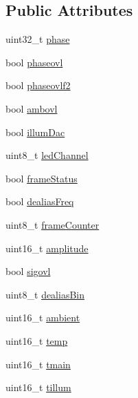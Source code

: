 \subsection*{Public Attributes}
\begin{DoxyCompactItemize}
\item 
uint32\+\_\+t \mbox{\hyperlink{class_o_p_t3101frame_data_a4d07c723715856ea9652b3d672d01191}{phase}}
\item 
bool \mbox{\hyperlink{class_o_p_t3101frame_data_ab71ed5cd3a72ab4c4d46159aee96f9b9}{phaseovl}}
\item 
bool \mbox{\hyperlink{class_o_p_t3101frame_data_aaf6bdf023298dc74ba130812f7d2166e}{phaseovlf2}}
\item 
bool \mbox{\hyperlink{class_o_p_t3101frame_data_ab84944f362b3b192623351ad0f65ce20}{ambovl}}
\item 
bool \mbox{\hyperlink{class_o_p_t3101frame_data_a8b74b6e231e0b4b2cd1e88904bac642c}{illum\+Dac}}
\item 
uint8\+\_\+t \mbox{\hyperlink{class_o_p_t3101frame_data_a9319425349dd5d97faa2e525f41f391b}{led\+Channel}}
\item 
bool \mbox{\hyperlink{class_o_p_t3101frame_data_a790964613d473578a86a653a6a73b640}{frame\+Status}}
\item 
bool \mbox{\hyperlink{class_o_p_t3101frame_data_ac57c7900e7d17af6b38f581af290f9f1}{dealias\+Freq}}
\item 
uint8\+\_\+t \mbox{\hyperlink{class_o_p_t3101frame_data_ac3c83f1d1ac041f9c7d76b9f17ba4288}{frame\+Counter}}
\item 
uint16\+\_\+t \mbox{\hyperlink{class_o_p_t3101frame_data_afa54605b8cda791f6db34b225aa6574e}{amplitude}}
\item 
bool \mbox{\hyperlink{class_o_p_t3101frame_data_a85c53a23858d7716ceee6cb01eb29f1a}{sigovl}}
\item 
uint8\+\_\+t \mbox{\hyperlink{class_o_p_t3101frame_data_af137abf981abb2d3a81c82dd1ce883bf}{dealias\+Bin}}
\item 
uint16\+\_\+t \mbox{\hyperlink{class_o_p_t3101frame_data_a901d8630d15b79b558e7d7c5a9d08cc7}{ambient}}
\item 
uint16\+\_\+t \mbox{\hyperlink{class_o_p_t3101frame_data_a840f6949d680269d23667427d47c091c}{temp}}
\item 
uint16\+\_\+t \mbox{\hyperlink{class_o_p_t3101frame_data_a189413120d1a3cf9c248caaff5f8640a}{tmain}}
\item 
uint16\+\_\+t \mbox{\hyperlink{class_o_p_t3101frame_data_ac4d02a33435290a23b637ee678a93d9e}{tillum}}
\end{DoxyCompactItemize}


